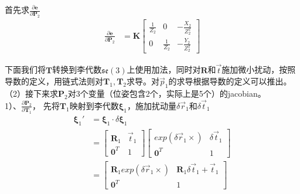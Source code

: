 \documentclass{article}
\begin{document}
首先求$\frac {\partial{\boldsymbol{e}}}{\partial{\boldsymbol{P}_2}}$
\begin{equation}
	\begin{aligned}
		\frac {\partial{\boldsymbol{e}}}{\partial{\boldsymbol{P}_2}}&=\boldsymbol K 
		\left[
		\begin{matrix}
		\frac{1}{Z_2} & 0             & -\frac{X_2}{Z_2^2} \\
		0             & \frac{1}{Z_2} & -\frac{Y_2}{Z_2^2} 
		\end{matrix}
		\right]
	\end{aligned}
\end{equation} 

下面我们将$\boldsymbol{T}$转换到李代数$\mathfrak{se}(3)$上使用加法，同时对$\boldsymbol{R}$和$\vec{t}$施加微小扰动，按照导数的定义，用链式法则对$\boldsymbol{T}_1,\boldsymbol{T}_2$求导。对$\vec{p}_1$的求导根据导数的定义可以推出。\\
（2）接下来求$\boldsymbol{P}_2$对3个变量（位姿包含2个，实际上是5个）的jacobian。 \\
1）、$\frac{\partial{\boldsymbol{P}_2}}{\partial{\boldsymbol{T}_1}}$， 先将$\boldsymbol{T}_1$映射到李代数$\boldsymbol{\xi}_1$，施加扰动量$\delta \vec{r}_1$和$\delta\vec{t}_1$
\begin{equation}
	\begin{aligned}
		\boldsymbol{\xi}_1'                         & =\boldsymbol{\xi}_1 \cdot \delta \boldsymbol{\xi}_1 \\&=
		\left[
		\begin{matrix}  
		\boldsymbol{R}_1                            & \vec{t}_1                                           \\  
		\boldsymbol{0}^T                            & 1                                                   
		\end{matrix}
		\right]
		\left[ 
		\begin{matrix} 
		exp(\delta \vec{r}_1\times)                 & \delta\vec{t}_1                                     \\
		\boldsymbol{0}^T                            & 1                                                   
		\end{matrix}
		\right]\\&=
		\left[ 
		\begin{matrix} 
		\boldsymbol{R}_1exp(\delta \vec{r}_1\times) & \boldsymbol{R}_1\delta \vec{t}_1+\vec{t}_1          \\ 
		\boldsymbol{0}^T                            & 1                                                   
		\end{matrix}
		\right]
	\end{aligned}
\end{equation}
\end{document}
